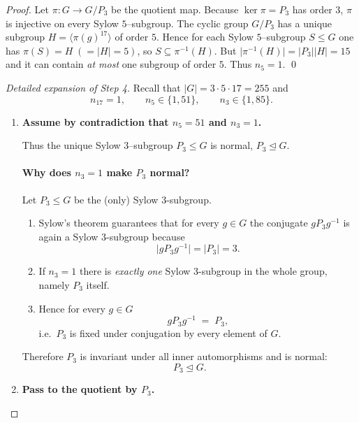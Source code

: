 \documentclass[12pt]{article}
\theoremstyle{definition} %
\theoremstyle{plain} %
\begin{document}
\emph{Proof.}
Let $\pi:G\to G/P_{3}$ be the quotient map.
Because $\ker\pi=P_{3}$ has order $3$, $\pi$ is injective on every
Sylow $5$–subgroup.
The cyclic group $G/P_{3}$ has a unique subgroup
$H=\langle \pi(g)^{17}\rangle$ of order $5$.
Hence for each Sylow $5$–subgroup $S\le G$ one has
$\pi(S)=H\;(=|H|=5)$, so $S\subseteq\pi^{-1}(H)$.
But $\lvert\pi^{-1}(H)\rvert=|P_{3}||H|=15$ and it can contain
\emph{at most} one subgroup of order $5$.
Thus $n_{5}=1$.
\qed
\begin{proof}[Detailed expansion of Step 4]
  Recall that $|G| = 3\cdot 5 \cdot 17 = 255$ and
  \[
  n_{17}=1,\qquad 
  n_{5}\in\{1,51\},\qquad 
  n_{3}\in\{1,85\}.
  \]
  
  \begin{enumerate}
  \item \textbf{Assume by contradiction that $n_{5}=51$ and $n_{3}=1$.}
  
        Thus the unique Sylow $3$–subgroup 
        $P_{3}\le G$ is normal, $P_{3}\trianglelefteq G$.
        \paragraph{Why does \(n_{3}=1\) make \(P_{3}\) normal?}

Let \(P_{3}\le G\) be the (only) Sylow \(3\)-subgroup.

\begin{enumerate}
    \item Sylow’s theorem guarantees that for every \(g\in G\) the conjugate
          \(gP_{3}g^{-1}\) is again a Sylow \(3\)-subgroup because
          \[
              \lvert gP_{3}g^{-1}\rvert 
              = \lvert P_{3}\rvert
              = 3 .
          \]
    \item If \(n_{3}=1\) there is \emph{exactly one} Sylow \(3\)-subgroup in
          the whole group, namely \(P_{3}\) itself.
    \item Hence for every \(g\in G\)
          \[
              gP_{3}g^{-1}\;=\;P_{3},
          \]
          i.e.\ \(P_{3}\) is fixed under conjugation by every element of
          \(G\).
\end{enumerate}

Therefore \(P_{3}\) is invariant under all inner automorphisms and is
normal:
\[
    P_{3}\trianglelefteq G.
\]
        
  \item \textbf{Pass to the quotient by $P_{3}$.}
  

\end{enumerate}
\end{proof}
\end{document}
